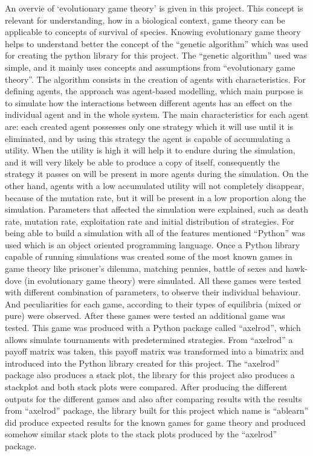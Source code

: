 An overvie of `evolutionary game theory' is given in this project. This concept is relevant for understanding, how in a biological context, game theory can be applicable to concepts of survival of species. Knowing evolutionary game theory helps to understand better the concept of the ``genetic algorithm'' which was used for creating the python library for this project. The ``genetic algorithm'' used was simple, and it mainly uses concepts and assumptions from ``evolutionary game theory''. The algorithm consists in the creation of agents with characteristics. For defining agents, the approach was agent-based modelling, which main purpose is to simulate how the interactions between different agents has an effect on the individual agent and in the whole system. The main characteristics for each agent are: each created agent possesses only one strategy which it will use until it is eliminated, and by using this strategy the agent is capable of accumulating a utility. When the utility is high it will help it to endure during the simulation, and it will very likely be able to produce a copy of itself, consequently the strategy it passes on will be present in more agents during the simulation. On the other hand, agents with a low accumulated utility will not completely disappear, because of the mutation rate, but it will be present in a low proportion along the simulation. Parameters that affected  the simulation were explained, such as death rate, mutation rate, exploitation rate and initial distribution of strategies. For being able to build a simulation with all of the features mentioned ``Python'' was used which is an object oriented programming language. Once a Python library capable of running simulations was created some of the most known games in game theory like prisoner's dilemma, matching pennies, battle of sexes and hawk-dove (in evolutionary game theory) were simulated. All these games were tested with different combination of parameters, to observe their individual behaviour. And peculiarities for each game, according to their types of equilibria (mixed or pure) were observed. After these games were tested an additional game was tested. This game was produced with a Python package called ``axelrod'', which allows simulate tournaments with predetermined strategies. From ``axelrod'' a payoff matrix was taken, this payoff matrix was transformed into a bimatrix and introduced into the Python library created for this project. The ``axelrod'' package also produces a stack plot, the library for this project also produces a stackplot and both stack plots were compared. After producing the different outputs for the different games and also after comparing results with the results from ``axelrod'' package, the library built for this project which name is ``ablearn'' did produce expected results for the known games for game theory and produced somehow similar stack plots to the stack plots produced by the ``axelrod'' package.